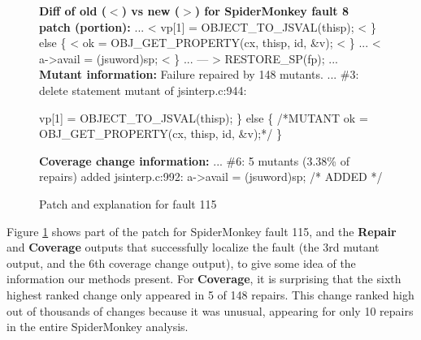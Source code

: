 \begin{figure}                                                
{\scriptsize                                                  
\begin{code}                                                  
{\bf Diff of old ($<$) vs new ($>$) for SpiderMonkey fault 8 patch (portion):} 
...                                                           
<             vp[1] = OBJECT\_TO\_JSVAL(thisp);               
<         \} else \{                                          
<             ok = OBJ\_GET\_PROPERTY(cx, thisp, id, \&v);    
<         \}                                                  
...                                                           
<                   a->avail = (jsuword)sp;                   
<               \}                                            
...                                                           
---                                                           
>         RESTORE\_SP(fp);                                    
...                                                           
{\bf Mutant information:}                                     
Failure repaired by 148 mutants.                              
...                                                           
\#3: delete statement mutant of jsinterp.c:944:               
                                                              
            vp[1] = OBJECT\_TO\_JSVAL(thisp);                 
        \} else \{                                            
/*MUTANT    ok = OBJ\_GET\_PROPERTY(cx, thisp, id, \&v);*/    
        \}                                                    



{\bf Coverage change information:}
...
\#6: 5 mutants (3.38\% of repairs) added jsinterp.c:992:
                   a->avail = (jsuword)sp; /* ADDED */                                                            
\end{code}                                                    
}                                                             
\caption{Patch and explanation for fault 115}                 
\label{fig:explain}                                           
\end{figure}                                               


Figure \ref{fig:explain} shows part of the patch for SpiderMonkey fault 115, and the {\bf Repair} and {\bf Coverage} outputs that successfully localize the fault (the 3rd mutant output, and the 6th coverage change output), to give some idea of the information our methods present.  For {\bf Coverage}, it is surprising that the sixth highest ranked change only appeared in 5 of 148 repairs. This change ranked high out of thousands of changes because it was unusual, appearing for only 10 repairs in the entire SpiderMonkey analysis. 

